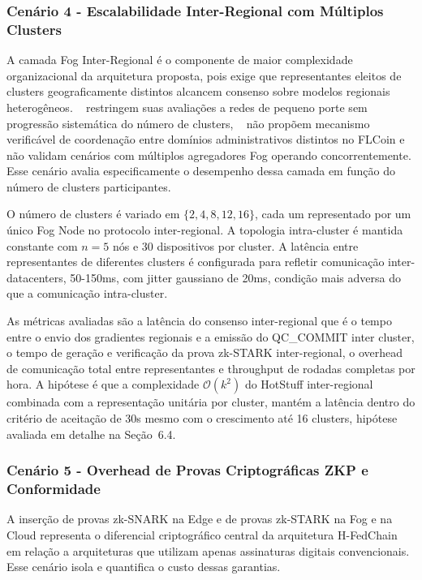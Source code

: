 \documentclass[12pt]{article}
\begin{document}
\subsubsection{Cenário 4 - Escalabilidade Inter-Regional com Múltiplos Clusters}
\label{cen:interregional}

A camada Fog Inter-Regional é o componente de maior complexidade organizacional da arquitetura proposta, pois exige que representantes eleitos de clusters geograficamente distintos alcancem consenso sobre modelos regionais heterogêneos. ~\cite{murthy2026} restringem suas avaliações a redes de pequeno porte sem progressão sistemática do número de clusters, ~\cite{ren2024} não propõem mecanismo verificável de coordenação entre domínios administrativos distintos no FLCoin e \cite{baucas2023} não validam cenários com múltiplos agregadores Fog operando concorrentemente. Esse cenário avalia especificamente o desempenho dessa camada em função do número de clusters participantes.

O número de clusters é variado em $\{2, 4, 8,12, 16\}$, cada um representado por um único Fog Node no protocolo inter-regional. A topologia intra-cluster é mantida constante com $n=5$ nós e 30 dispositivos por cluster. A latência entre representantes de diferentes clusters é configurada para refletir comunicação inter-datacenters, 50-150ms, com jitter gaussiano de 20ms, condição mais adversa do que a comunicação intra-cluster.

As métricas avaliadas são a latência do consenso inter-regional que é o tempo entre o envio dos gradientes regionais e a emissão do QC\_COMMIT inter cluster, o tempo de geração e verificação da prova zk-STARK inter-regional, o overhead de comunicação total entre representantes e throughput de rodadas completas por hora. A hipótese é que a complexidade $\mathcal{O}(k^2)$ do HotStuff inter-regional combinada com a representação unitária por cluster, mantém a latência dentro do critério de aceitação de 30s mesmo com o crescimento até 16 clusters, hipótese avaliada em detalhe na Seção~6.4.

\subsubsection{Cenário 5 - Overhead de Provas Criptográficas ZKP e Conformidade}

A inserção de provas zk-SNARK na Edge e de provas zk-STARK na Fog e na Cloud representa o diferencial criptográfico central da arquitetura H-FedChain em relação a arquiteturas que utilizam apenas assinaturas digitais convencionais. Esse cenário isola e quantifica o custo dessas garantias.
\end{document}
